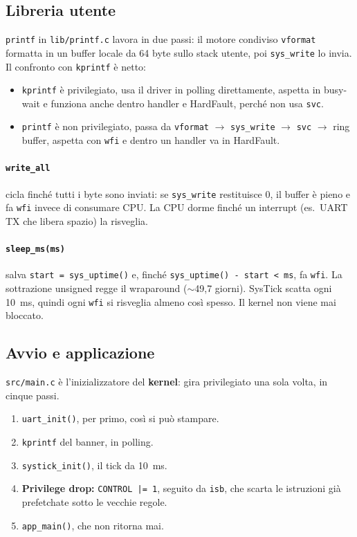 \subsection*{Libreria utente}
\texttt{printf} in \texttt{lib/printf.c} lavora in due passi: il motore condiviso \texttt{vformat} formatta in un buffer locale da 64 byte sullo stack utente, poi \texttt{sys\_write} lo invia. Il confronto con \texttt{kprintf} è netto:
\begin{itemize}
    \item \texttt{kprintf} è privilegiato, usa il driver in polling direttamente, aspetta in busy-wait e funziona anche dentro handler e HardFault, perché non usa \texttt{svc}.
    \item \texttt{printf} è non privilegiato, passa da \texttt{vformat} $\rightarrow$ \texttt{sys\_write} $\rightarrow$ \texttt{svc} $\rightarrow$ ring buffer, aspetta con \texttt{wfi} e dentro un handler va in HardFault.
\end{itemize}
 
\paragraph*{\texttt{write\_all}} cicla finché tutti i byte sono inviati: se \texttt{sys\_write} restituisce 0, il buffer è pieno e fa \texttt{wfi} invece di consumare CPU. La CPU dorme finché un interrupt (es.\ UART TX che libera spazio) la risveglia.
 
\paragraph*{\texttt{sleep\_ms(ms)}} salva \texttt{start = sys\_uptime()} e, finché \texttt{sys\_uptime() - start < ms}, fa \texttt{wfi}. La sottrazione unsigned regge il wraparound ($\sim$49,7 giorni). SysTick scatta ogni 10~ms, quindi ogni \texttt{wfi} si risveglia almeno così spesso. Il kernel non viene mai bloccato.
 
\subsection*{Avvio e applicazione}
\texttt{src/main.c} è l'inizializzatore del \textbf{kernel}: gira privilegiato una sola volta, in cinque passi.
\begin{enumerate}
    \item \texttt{uart\_init()}, per primo, così si può stampare.
    \item \texttt{kprintf} del banner, in polling.
    \item \texttt{systick\_init()}, il tick da 10~ms.
    \item \textbf{Privilege drop:} \texttt{CONTROL |= 1}, seguito da \texttt{isb}, che scarta le istruzioni già prefetchate sotto le vecchie regole.
    \item \texttt{app\_main()}, che non ritorna mai.
\end{enumerate}
 
